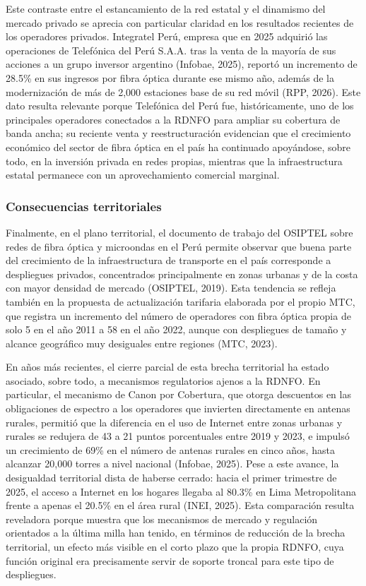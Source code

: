 Este contraste entre el estancamiento de la red estatal y el dinamismo del mercado privado se aprecia con particular claridad en los resultados recientes de los operadores privados. Integratel Perú, empresa que en 2025 adquirió las operaciones de Telefónica del Perú S.A.A. tras la venta de la mayoría de sus acciones a un grupo inversor argentino (Infobae, 2025), reportó un incremento de 28.5\% en sus ingresos por fibra óptica durante ese mismo año, además de la modernización de más de 2,000 estaciones base de su red móvil (RPP, 2026). Este dato resulta relevante porque Telefónica del Perú fue, históricamente, uno de los principales operadores conectados a la RDNFO para ampliar su cobertura de banda ancha; su reciente venta y reestructuración evidencian que el crecimiento económico del sector de fibra óptica en el país ha continuado apoyándose, sobre todo, en la inversión privada en redes propias, mientras que la infraestructura estatal permanece con un aprovechamiento comercial marginal.

\subsubsection{Consecuencias territoriales}
Finalmente, en el plano territorial, el documento de trabajo del OSIPTEL sobre redes de fibra óptica y microondas en el Perú permite observar que buena parte del crecimiento de la infraestructura de transporte en el país corresponde a despliegues privados, concentrados principalmente en zonas urbanas y de la costa con mayor densidad de mercado (OSIPTEL, 2019). Esta tendencia se refleja también en la propuesta de actualización tarifaria elaborada por el propio MTC, que registra un incremento del número de operadores con fibra óptica propia de solo 5 en el año 2011 a 58 en el año 2022, aunque con despliegues de tamaño y alcance geográfico muy desiguales entre regiones (MTC, 2023).

En años más recientes, el cierre parcial de esta brecha territorial ha estado asociado, sobre todo, a mecanismos regulatorios ajenos a la RDNFO. En particular, el mecanismo de Canon por Cobertura, que otorga descuentos en las obligaciones de espectro a los operadores que invierten directamente en antenas rurales, permitió que la diferencia en el uso de Internet entre zonas urbanas y rurales se redujera de 43 a 21 puntos porcentuales entre 2019 y 2023, e impulsó un crecimiento de 69\% en el número de antenas rurales en cinco años, hasta alcanzar 20,000 torres a nivel nacional (Infobae, 2025). Pese a este avance, la desigualdad territorial dista de haberse cerrado: hacia el primer trimestre de 2025, el acceso a Internet en los hogares llegaba al 80.3\% en Lima Metropolitana frente a apenas el 20.5\% en el área rural (INEI, 2025). Esta comparación resulta reveladora porque muestra que los mecanismos de mercado y regulación orientados a la última milla han tenido, en términos de reducción de la brecha territorial, un efecto más visible en el corto plazo que la propia RDNFO, cuya función original era precisamente servir de soporte troncal para este tipo de despliegues.

